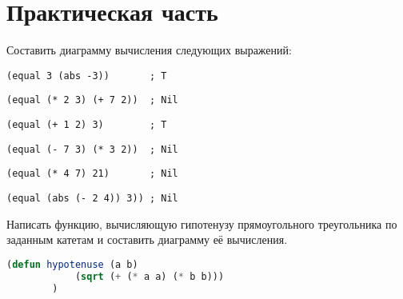 \documentclass[a4paper,oneside,12pt]{extreport}
\begin{document}


\section*{Практическая часть}

\begin{task}
	Составить диаграмму вычисления следующих выражений:
	\begin{AutoMultiColEnumerate}
		\item \begin{lstlisting}[style=lispinline, gobble=24]
			(equal 3 (abs -3))       ; T
		\end{lstlisting}

		\item \begin{lstlisting}[style=lispinline, gobble=24]
			(equal (* 2 3) (+ 7 2))  ; Nil
		\end{lstlisting}

		\item \begin{lstlisting}[style=lispinline, gobble=24]
			(equal (+ 1 2) 3)        ; T
		\end{lstlisting}

		\item \begin{lstlisting}[style=lispinline, gobble=24]
			(equal (- 7 3) (* 3 2))  ; Nil
		\end{lstlisting}

		\item \begin{lstlisting}[style=lispinline, gobble=24]
			(equal (* 4 7) 21)       ; Nil
		\end{lstlisting}

		\item \begin{lstlisting}[style=lispinline, gobble=24]
			(equal (abs (- 2 4)) 3)) ; Nil
		\end{lstlisting}
	\end{AutoMultiColEnumerate}
\end{task}

\begin{task}
	Написать функцию, вычисляющую гипотенузу прямоугольного треугольника по заданным катетам и составить диаграмму её вычисления.

	\begin{lstlisting}[language=Lisp, gobble=16]
		(defun hypotenuse (a b)
			(sqrt (+ (* a a) (* b b)))
		)
	\end{lstlisting}
\end{task}
\end{document}
